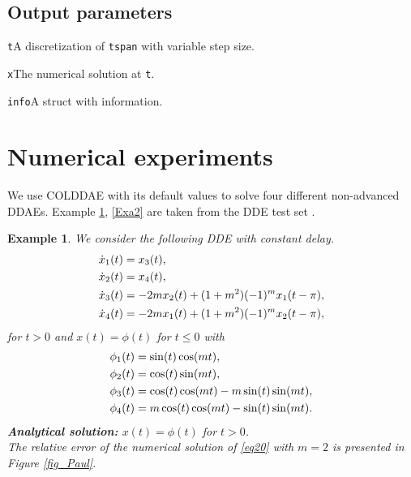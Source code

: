 \documentclass[final,reqno]{siamltex}
\renewenvironment{itemize}[1]{\begin{compactitem}#1}{\end{compactitem}}
\newtheorem{example}[theorem]{Example}
\begin{document}
\subsection{Output parameters}
\begin{itemize}
\item {\tt t}\quad A discretization of {\tt tspan} with variable step size.
\item {\tt x}\quad The numerical solution at {\tt t}.
\item {\tt info}\quad A struct with information.
\end{itemize}

\section{Numerical experiments}
We use COLDDAE with its default values to solve four different non-advanced DDAEs. 
Example \ref{Exa1}, \ref{Exa2} are taken from the DDE test set \cite{Pau94}.
%
\begin{example}\label{Exa1} We consider the following DDE with constant delay.
%
\bsq\label{eq20}
\begin{equation}\label{eq20a}
\bsp{
\dot{x}_1(t) & = x_3(t),\\
\dot{x}_2(t) & = x_4(t),\\
\dot{x}_3(t) & = -2mx_2(t)+(1+m^2)(-1)^mx_1(t-\pi),\\
\dot{x}_4(t) & = -2mx_1(t)+(1+m^2)(-1)^mx_2(t-\pi),
}
\end{equation}
for $t>0$ and $x(t)=\phi(t)$ for $t\leq 0$ with 
\begin{equation}\label{eq20b}
\bsp{
{\phi}_1(t) & = \sin(t)\cos(mt),\\
{\phi}_2(t) & = \cos(t)\sin(mt),\\
{\phi}_3(t) & = \cos(t)\cos(mt)-m\sin(t)\sin(mt),\\
{\phi}_4(t) & =m\cos(t)\cos(mt)-\sin(t)\sin(mt).
}
\end{equation}
\esq
%
{\bf Analytical solution:} \quad $x(t)=\phi(t)$ for $t>0$.\\
The relative error of the numerical solution of \eqref{eq20} with $m=2$ is presented in Figure \ref{fig_Paul}.
\end{example}
%
\end{document}

